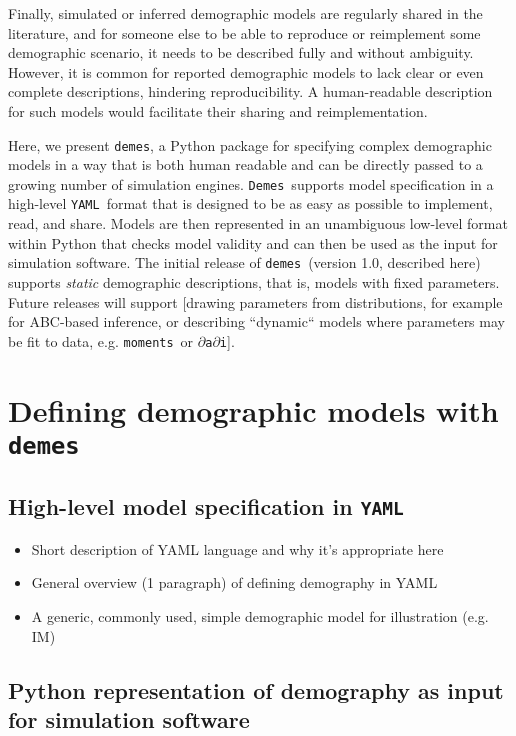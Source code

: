 \documentclass[11pt]{article}
\newcommand{\demes}[0]{\texttt{demes}}
\newcommand{\Demes}[0]{\texttt{Demes}}
\newcommand{\YAML}[0]{\texttt{YAML}}
\newcommand{\moments}[0]{\texttt{moments}}
\newcommand{\dadi}[0]{\texttt{$\partial$a$\partial$i}}
\begin{document}
Finally, simulated or inferred demographic models are regularly shared in the
literature, and for someone else to be able to reproduce or reimplement some
demographic scenario, it needs to be described fully and without ambiguity. However,
it is common for reported demographic models to lack clear or even complete
descriptions, hindering reproducibility. A human-readable description for
such models would facilitate their sharing and reimplementation.

Here, we present \demes, a Python package for specifying complex demographic models
in a way that is both human readable and can be directly passed to a growing
number of simulation engines. \Demes\ supports model specification in a high-level
\YAML\ format \citep{ben2009yaml}
that is designed to be as easy as possible to implement, read, and
share. Models are then represented in an unambiguous low-level format within Python
that checks model validity and can then be used as the input for simulation software.
The initial release of \demes\ (version 1.0, described here) supports \emph{static}
demographic descriptions, that is, models with fixed parameters. Future releases
will support [drawing parameters from distributions, for example for ABC-based
inference, or describing ``dynamic`` models where parameters may be fit to data,
e.g. \moments\ or \dadi].

\section*{Defining demographic models with \demes}

\subsection*{High-level model specification in \YAML}

\begin{itemize}
\item Short description of YAML language and why it's appropriate here
\item General overview (1 paragraph) of defining demography in YAML
\item A generic, commonly used, simple demographic model for illustration (e.g. IM)
\end{itemize}

\subsection*{Python representation of demography as input for simulation software}
\end{document}
